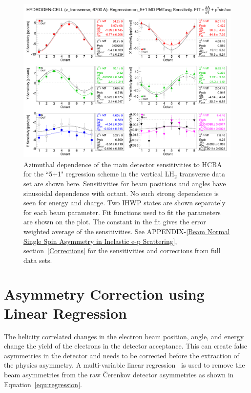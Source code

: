 \begin{figure}[!h]
	\begin{center}
	\includegraphics[width=15.0cm]{figures/MD_v_transverse_5+1_Sensitivities}
	\end{center}
	\caption
	{Azimuthal dependence of the main detector sensitivities to HCBA for the ``5+1" regression scheme in the vertical LH$_{2}$ transverse data set are shown here. Sensitivities for beam positions and angles have sinusoidal dependence with octant. No such strong dependence is seen for energy and charge. Two IHWP states are shown separately for each beam parameter. Fit functions used to fit the parameters are shown on the plot. The constant in the fit gives the error weighted average of the sensitivities. See APPENDIX-\ref{Beam Normal Single Spin Asymmetry in Inelastic e-p Scattering}, section~\ref{Corrections}  for the sensitivities and corrections from full data sets.}
	\label{fig:MD_v_transverse_5+1_Sensitivities}
\end{figure}


\section{Asymmetry Correction using Linear Regression}
\label{Asymmetry Correction using Linear Regression}

The helicity correlated changes in the electron beam position, angle, and energy change the yield of the electrons in the detector acceptance. This can create false asymmetries in the detector and needs to be corrected before the extraction of the physics asymmetry. A multi-variable linear regression~\cite{linRegTechNote} is used to remove the beam asymmetries from the raw \v{C}erenkov detector asymmetries as shown in Equation~\ref{equ:regression}.

